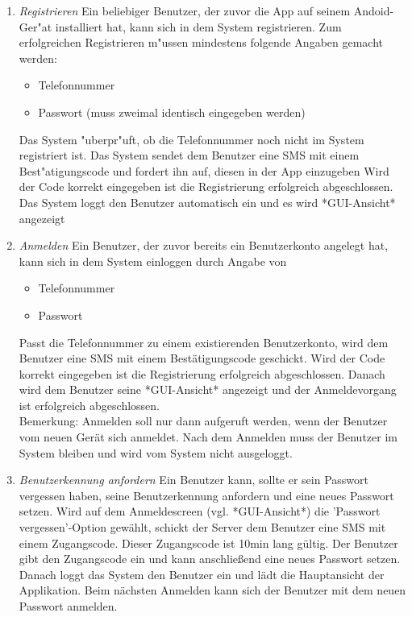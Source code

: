 \documentclass[parskip=full]{scrartcl}
\def\threedigits#1{%
  \ifnum#1<100 0\fi
  \ifnum#1<10 0\fi
  \number#1}
\begin{document}
\begin{enumerate}[label={\textbf{/F\protect\threedigits{\theenumi}0/}}, leftmargin=*]
	
	\item \textit{Registrieren} Ein beliebiger Benutzer, der zuvor die App auf seinem Andoid-Ger"at installiert hat, kann sich in dem \gls{System} registrieren. Zum erfolgreichen Registrieren m"ussen mindestens folgende Angaben gemacht werden:
	\begin{itemize}
		\item Telefonnummer %
		\item Passwort (muss zweimal identisch eingegeben werden)
	\end{itemize}
	 Das System "uberpr"uft, ob die Telefonnummer noch nicht im System registriert ist. Das System sendet dem Benutzer eine SMS %
	 mit einem Best"atigungscode und fordert ihn auf, diesen in der App einzugeben %
	 Wird der Code korrekt eingegeben ist die Registrierung erfolgreich abgeschlossen. Das System loggt den Benutzer automatisch ein und es wird *GUI-Ansicht* angezeigt %
	 	
	\item \textit{Anmelden} Ein Benutzer, der zuvor bereits ein Benutzerkonto angelegt hat, kann sich in dem System einloggen durch Angabe von
	\begin{itemize}
		\item Telefonnummer
		\item Passwort
	\end{itemize}
	Passt die Telefonnummer zu einem existierenden Benutzerkonto, wird dem Benutzer eine SMS mit einem Bestätigungscode geschickt. Wird der Code korrekt eingegeben ist die Registrierung erfolgreich abgeschlossen. Danach wird dem Benutzer seine *GUI-Ansicht* angezeigt und der Anmeldevorgang ist erfolgreich abgeschlossen.\\
Bemerkung: Anmelden soll nur dann aufgeruft werden, wenn der Benutzer vom neuen Gerät sich anmeldet. Nach dem Anmelden muss der Benutzer im System bleiben und wird vom System nicht ausgeloggt.
	
	\item \textit{Benutzerkennung anfordern} Ein Benutzer kann, sollte er sein Passwort vergessen haben, seine Benutzerkennung anfordern und eine neues Passwort setzen. Wird auf dem Anmeldescreen (vgl. *GUI-Ansicht*) die 'Passwort vergessen'-Option gewählt, schickt der Server dem Benutzer eine SMS mit einem Zugangscode. Dieser Zugangscode ist 10min lang gültig. Der Benutzer gibt den Zugangscode ein und kann anschließend eine neues Passwort setzen. Danach loggt das System den Benutzer ein und lädt die Hauptansicht der Applikation. Beim nächsten Anmelden kann sich der Benutzer mit dem neuen Passwort anmelden.
	

\end{enumerate}
\end{document}
